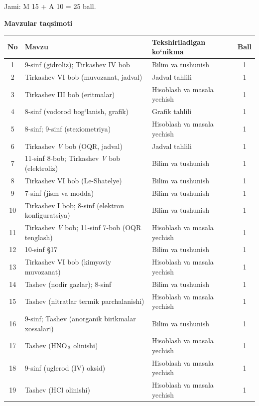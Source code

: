 \documentclass[11pt,a4paper]{article}
\renewcommand{\textsubscript}[1]{\ensuremath{_{\text{\fontsize{8}{8}\selectfont #1}}}}
\begin{document}
\noindent Jami: M 15 + A 10 = 25 ball.\par
\par\bigskip\noindent\textbf{Mavzular taqsimoti}\par\smallskip
{\small\noindent\begin{longtable}{|c|p{7.2cm}|p{5.4cm}|c|}\hline \textbf{No} & \textbf{Mavzu} & \textbf{Tekshiriladigan ko`nikma} & \textbf{Ball}\\\hline
1 & 9-sinf (gidroliz); Tirkashev IV bob & Bilim va tushunish & 1\\\hline
2 & Tirkashev VI bob (muvozanat, jadval) & Jadval tahlili & 1\\\hline
3 & Tirkashev III bob (eritmalar) & Hisoblash va masala yechish & 1\\\hline
4 & 8-sinf (vodorod bog`lanish, grafik) & Grafik tahlili & 1\\\hline
5 & 8-sinf; 9-sinf (stexiometriya) & Hisoblash va masala yechish & 1\\\hline
6 & Tirkashev \textit{V} bob (OQR, jadval) & Jadval tahlili & 1\\\hline
7 & 11-sinf 8-bob; Tirkashev \textit{V} bob (elektroliz) & Bilim va tushunish & 1\\\hline
8 & Tirkashev VI bob (Le-Shatelye) & Bilim va tushunish & 1\\\hline
9 & 7-sinf (jism va modda) & Bilim va tushunish & 1\\\hline
10 & Tirkashev I bob; 8-sinf (elektron konfiguratsiya) & Bilim va tushunish & 1\\\hline
11 & Tirkashev \textit{V} bob; 11-sinf 7-bob (OQR tenglash) & Hisoblash va masala yechish & 1\\\hline
12 & 10-sinf \S{}17 & Bilim va tushunish & 1\\\hline
13 & Tirkashev VI bob (kimyoviy muvozanat) & Hisoblash va masala yechish & 1\\\hline
14 & Tashev (nodir gazlar); 8-sinf & Bilim va tushunish & 1\\\hline
15 & Tashev (nitratlar termik parchalanishi) & Hisoblash va masala yechish & 1\\\hline
16 & 9-sinf; Tashev (anorganik birikmalar xossalari) & Bilim va tushunish & 1\\\hline
17 & Tashev (HNO\textsubscript{3} olinishi) & Hisoblash va masala yechish & 1\\\hline
18 & 9-sinf (uglerod (IV) oksid) & Hisoblash va masala yechish & 1\\\hline
19 & Tashev (HCl olinishi) & Hisoblash va masala yechish & 1\\\hline

\end{longtable}}
\end{document}
